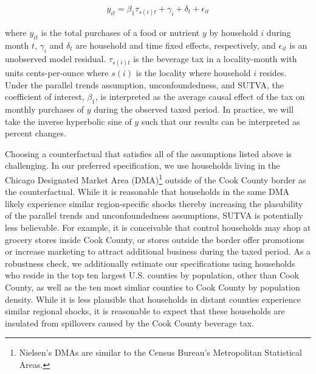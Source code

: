 \documentclass[12pt]{article}
\begin{document}
\begin{align}
	y_{it} = \beta_1 \tau_{s(i)t} + \gamma_i + \delta_t + \epsilon_{it} \label{spec_did}
\end{align}

where $y_{it}$ is the total purchases of a food or nutrient $y$ by household $i$ during month $t$, $\gamma_i$ and $\delta_t$ are household and time fixed effects, respectively, and $\epsilon_{it}$ is an unobserved model residual. $\tau_{s(i)t}$ is the beverage tax in a locality-month with units cents-per-ounce where $s(i)$ is the locality where household $i$ resides. Under the parallel trends assumption, unconfoundedness, and SUTVA, the coefficient of interest, $\beta_1$, is interpreted as the average causal effect of the tax on monthly purchases of $y$ during the observed taxed period. In practice, we will take the inverse hyperbolic sine of $y$ such that our results can be interpreted as percent changes.

Choosing a counterfactual that satisfies all of the assumptions listed above is challenging. In our preferred specification, we use households living in the Chicago Designated Market Area (DMA)\footnote{Nielsen's DMAs are similar to the Census Bureau's Metropolitan Statistical Areas.} outside of the Cook County border as the counterfactual. While it is reasonable that households in the same DMA likely experience similar region-specific shocks thereby increasing the plasubility of the parallel trends and unconfoundedness assumptions, SUTVA is potentially less believable. For example, it is conceivable that control households may shop at grocery stores inside Cook County, or stores outside the border offer promotions or increase marketing to attract additional business during the taxed period. As a robustness check, we additionally estimate our specifications using households who reside in the top ten largest U.S. counties by population, other than Cook County, as well as the ten most simliar counties to Cook County by population density. While it is less plausible that households in distant counties experience similar regional shocks, it is reasonable to expect that these households are insulated from spillovers caused by the Cook County beverage tax.

\end{document}

